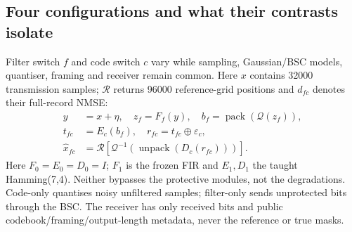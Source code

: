 \FloatBarrier
\subsection{Four configurations and what their contrasts isolate}
\label{sec:r42}
Filter switch $ f $ and code switch $ c $ vary while sampling, Gaussian/BSC
models, quantiser, framing and receiver remain common. Here $ x $ contains
32000 transmission samples; $\mathcal R $ returns 96000 reference-grid
positions and $ d_{fc}$ denotes their full-record NMSE:
\begin{align}
 y&=x+\eta,\quad z_f=F_f(y),\quad
 b_f=\operatorname{pack}(\mathcal Q(z_f)),\nonumber\\
 t_{fc}&=E_c(b_f),\quad r_{fc}=t_{fc}\oplus\varepsilon_c,\nonumber\\
 \widehat x_{fc}&=\mathcal R\!\left[
 \mathcal Q^{-1}\!\left(\operatorname{unpack}(D_c(r_{fc}))\right)\right].
 \label{eq:r42-chain}
\end{align}
Here $ F_0=E_0=D_0=I $; $ F_1 $ is the frozen FIR and $ E_1,D_1 $ the taught
Hamming(7,4). Neither bypasses the protective modules, not the degradations.
Code-only quantises noisy unfiltered samples; filter-only sends unprotected
bits through the BSC. The receiver has only received bits and public
codebook/framing/output-length metadata, never the reference or true masks.

\begin{table}[htbp]
 \centering
 \small
 \caption{Four actual paths carrying 448000 real information bits. Gaussian noise, quantisation, BSC and reconstruction remain enabled in every configuration.}
 \label{tab:r42-configurations}
 
 
 
\end{table}


